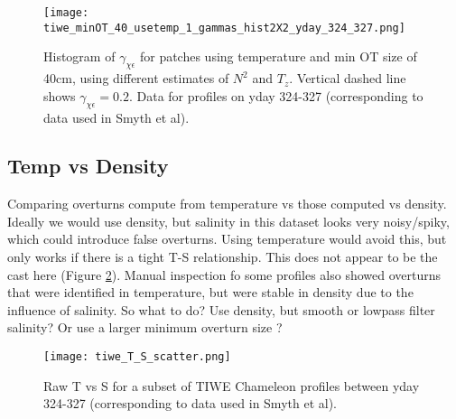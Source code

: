\documentclass[11pt]{article}
\begin{document}
\begin{figure}[htbp]
\texttt{[image: tiwe\_minOT\_40\_usetemp\_1\_gammas\_hist2X2\_yday\_324\_327.png]}
\caption{Histogram of $\gamma_{\chi\epsilon}$ for patches using temperature and min OT size of 40cm, using different estimates of $N^2$ and $T_z$. Vertical dashed line shows $\gamma_{\chi\epsilon}=0.2$. Data for profiles on yday 324-327 (corresponding to data used in Smyth et al).}
\label{patchgam}
\end{figure}



\clearpage
\subsection{Temp vs Density}

Comparing overturns compute from temperature vs those computed vs density. Ideally we would use density, but salinity in this dataset looks very noisy/spiky, which could introduce false overturns. Using temperature would avoid this, but only works if there is a tight T-S relationship. This does not appear to be the cast here (Figure \ref{TSplot}). Manual inspection fo some profiles also showed overturns that were identified in temperature, but were stable in density due to the influence of salinity. So what to do? Use density, but smooth or lowpass filter salinity? Or use a larger minimum overturn size ?

\begin{figure}[htbp]
\texttt{[image: tiwe\_T\_S\_scatter.png]}
\caption{ Raw T vs S for a subset of TIWE Chameleon profiles between yday 324-327 (corresponding to data used in Smyth et al).}
\label{TSplot}
\end{figure}
\end{document}

